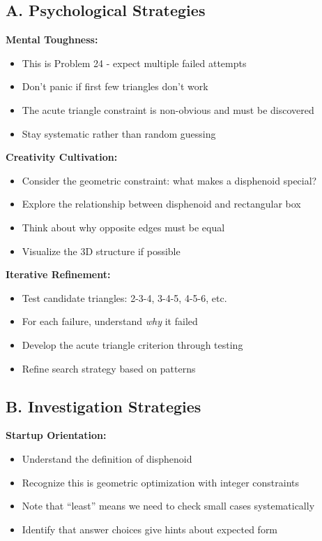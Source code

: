 \documentclass[12pt]{article}
\begin{document}
\begin{strategicbox}

\subsection*{A. Psychological Strategies}

\textbf{Mental Toughness:}
\begin{itemize}
    \item This is Problem 24 - expect multiple failed attempts
    \item Don't panic if first few triangles don't work
    \item The acute triangle constraint is non-obvious and must be discovered
    \item Stay systematic rather than random guessing
\end{itemize}

\textbf{Creativity Cultivation:}
\begin{itemize}
    \item Consider the geometric constraint: what makes a disphenoid special?
    \item Explore the relationship between disphenoid and rectangular box
    \item Think about why opposite edges must be equal
    \item Visualize the 3D structure if possible
\end{itemize}

\textbf{Iterative Refinement:}
\begin{itemize}
    \item Test candidate triangles: 2-3-4, 3-4-5, 4-5-6, etc.
    \item For each failure, understand \textit{why} it failed
    \item Develop the acute triangle criterion through testing
    \item Refine search strategy based on patterns
\end{itemize}

\subsection*{B. Investigation Strategies}

\textbf{Startup Orientation:}
\begin{itemize}
    \item Understand the definition of disphenoid
    \item Recognize this is geometric optimization with integer constraints
    \item Note that ``least'' means we need to check small cases systematically
    \item Identify that answer choices give hints about expected form
\end{itemize}


\end{strategicbox}
\end{document}
